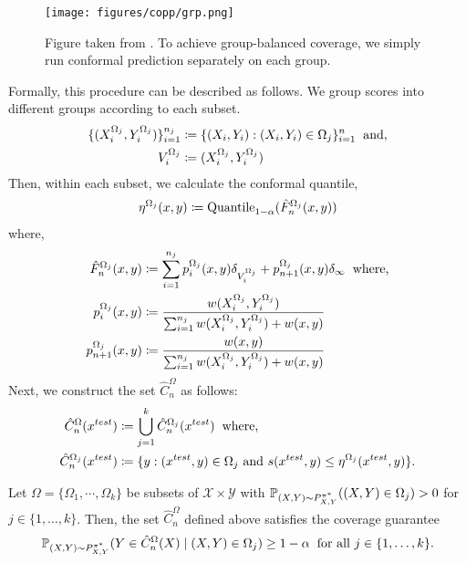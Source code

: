 \begin{figure}[!htp]
    \centering
    \texttt{[image: figures/copp/grp.png]}
    \caption{Figure taken from \cite{conf-bates}. To achieve group-balanced coverage, we simply run conformal prediction separately on each group.}
    \label{fig:grps}
\end{figure}
Formally, this procedure can be described as follows. We group scores into different groups according to each subset.
\begin{align}
    \{(X_i^{\Omega_j}, Y_i^{\Omega_j})\}_{i = 1}^{n_j} &\coloneqq \{(X_i, Y_i): (X_i, Y_i) \in \Omega_j\}_{i = 1}^{n} \hspace{0.2cm} \textup{and,} \nonumber \\
    V_i^{\Omega_j} &\coloneqq (X_i^{\Omega_j}, Y_i^{\Omega_j}) \nonumber
\end{align}
Then, within each subset, we calculate the conformal quantile, 
\begin{align}
    \eta^{\Omega_j}(x, y) \coloneqq \textup{Quantile}_{1-\alpha}( \hat{F}^{\Omega_j}_n(x, y)) \nonumber
\end{align}
where,
\begin{align}
    \hat{F}^{\Omega_j}_n(x, y) &\coloneqq \sum_{i=1}^{n_j} p_i^{\Omega_j} (x, y)\delta_{V_i^{\Omega_j}} + p_{n+1}^{\Omega_j}(x,y)\delta_\infty  \hspace{0.2cm} \textup{where,} \nonumber \\
    p_i^{\Omega_j} (x, y) &\coloneqq \frac{w(X^{\Omega_j}_i, Y^{\Omega_j}_i)}{\sum_{i=1}^{n_j} w(X^{\Omega_j}_i, Y^{\Omega_j}_i) + w(x,y)} \nonumber\\
    p_{n+1}^{\Omega_j} (x, y) &\coloneqq \frac{w(x,y)}{\sum_{i=1}^{n_j} w(X^{\Omega_j}_i, Y^{\Omega_j}_i) + w(x,y)} \nonumber
\end{align}
Next, we construct the set $\hat{C}_n^{\Omega}$ as follows:
\begin{align}
    \hat{C}_n^{\Omega}(x^{test}) &\coloneqq \bigcup_{j=1}^k \hat{C}_n^{\Omega_j}(x^{test}) \hspace{0.2cm} \textup{where,} \nonumber \\
    \hat{C}_n^{\Omega_j}(x^{test}) &\coloneqq \{y:  (x^{test}, y) \in \Omega_j \textup{ and } s(x^{test},y) \leq \eta^{\Omega_j}(x^{test}, y)  \}. \nonumber \\
\end{align}
\begin{proposition}\label{prop:grp-balanced-cp}
Let $\Omega = \{\Omega_1, \cdots, \Omega_k \}$ be subsets of $\mathcal{X} \times \mathcal{Y}$ with $\mathbb{P}_{(X,Y)\sim P^{\pi^*}_{X,Y}}((X,Y) \in \Omega_j) > 0$ for $j\in \{1, \dots, k\}$. Then, the set $\hat{C}_n^{\Omega}$ defined above satisfies the coverage guarantee 
\begin{align}
    \mathbb{P}_{(X,Y)\sim P^{\pi^*}_{X,Y}}(Y \in \hat{C}_n^\Omega(X) \mid (X, Y) \in  \Omega_j) \geq 1-\alpha \hspace{0.2cm} \textup{for all $j\in \{1, \dots, k\}$.} \nonumber
\end{align}
\end{proposition}

